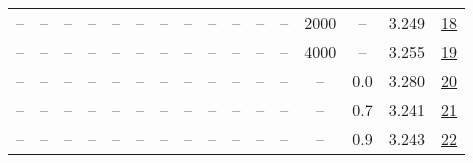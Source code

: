 \begin{table}[H]
\begin{tabular}{cccccccccccccccc}
-- & -- & -- & -- & -- & -- & -- & -- & -- & -- & -- & -- & 2000 & -- & 3.249 & \href{https://wandb.ai/stanford-mercury/optimizer-scaling/runs/sweep-300m-6B-kron624f48lr0.001-wd0.5-b10.95-plr0.2-pis1-gn1-nor-30df74}{18} \\
-- & -- & -- & -- & -- & -- & -- & -- & -- & -- & -- & -- & 4000 & -- & 3.255 & \href{https://wandb.ai/stanford-mercury/optimizer-scaling/runs/sweep-300m-6B-kron725c70lr0.001-wd0.5-b10.95-plr0.2-pis1-gn1-nor-641c26}{19} \\
-- & -- & -- & -- & -- & -- & -- & -- & -- & -- & -- & -- & -- & 0.0 & 3.280 & \href{https://wandb.ai/stanford-mercury/optimizer-scaling/runs/sweep-300m-6B-kron1939b5lr0.001-wd0.0-b10.95-plr0.2-pis1-gn1-nor-2af8b7}{20} \\
-- & -- & -- & -- & -- & -- & -- & -- & -- & -- & -- & -- & -- & 0.7 & 3.241 & \href{https://wandb.ai/stanford-mercury/optimizer-scaling/runs/sweep-300m-6B-kron0a397clr0.001-wd0.7-b10.95-plr0.2-pis1-gn1-nor-f6a567}{21} \\
-- & -- & -- & -- & -- & -- & -- & -- & -- & -- & -- & -- & -- & 0.9 & 3.243 & \href{https://wandb.ai/stanford-mercury/optimizer-scaling/runs/sweep-300m-6B-kron844b62lr0.001-wd0.9-b10.95-plr0.2-pis1-gn1-nor-5156e6}{22} \\
\bottomrule
\end{tabular}
\end{table}

